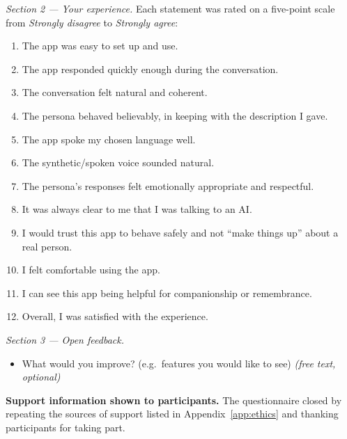 \documentclass[11pt,a4paper]{report}
\begin{document}
\textit{Section 2 --- Your experience.} Each statement was rated on a five-point scale from \emph{Strongly disagree} to \emph{Strongly agree}:
\begin{enumerate}[itemsep=2pt]
  \item The app was easy to set up and use.
  \item The app responded quickly enough during the conversation.
  \item The conversation felt natural and coherent.
  \item The persona behaved believably, in keeping with the description I gave.
  \item The app spoke my chosen language well.
  \item The synthetic/spoken voice sounded natural.
  \item The persona's responses felt emotionally appropriate and respectful.
  \item It was always clear to me that I was talking to an AI.
  \item I would trust this app to behave safely and not ``make things up'' about a real person.
  \item I felt comfortable using the app.
  \item I can see this app being helpful for companionship or remembrance.
  \item Overall, I was satisfied with the experience.
\end{enumerate}

\textit{Section 3 --- Open feedback.}
\begin{itemize}[itemsep=2pt]
  \item What would you improve? (e.g.\ features you would like to see) \emph{(free text, optional)}
\end{itemize}

\textbf{Support information shown to participants.} The questionnaire closed by repeating the sources of support listed in Appendix~\ref{app:ethics} and thanking participants for taking part.
\end{document}
